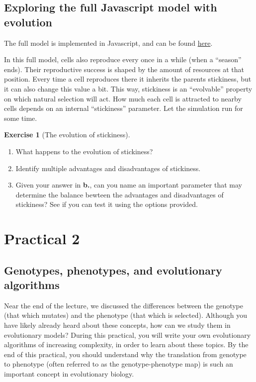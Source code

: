 \documentclass[
  letterpaper,
  DIV=11,
  numbers=noendperiod]{scrreprt}
\providecommand{\tightlist}{%
  \setlength{\itemsep}{0pt}\setlength{\parskip}{0pt}}\usepackage{longtable,booktabs,array}
\theoremstyle{definition}
\newtheorem{exercise}{Exercise}[chapter]
\theoremstyle{remark}
\begin{document}
\section{Exploring the full Javascript model with
evolution}\label{exploring-the-full-javascript-model-with-evolution}

The full model is implemented in Javascript, and can be found
\href{https://tbb.bio.uu.nl/bvd/simulations/collective_evolving_multi/}{here}.

In this full model, cells also reproduce every once in a while (when a
``season'' ends). Their reproductive success is shaped by the amount of
resources at that position. Every time a cell reproduces there it
inherits the parents stickiness, but it can also change this value a
bit. This way, stickiness is an ``evolvable'' property on which natural
selection will act. How much each cell is attracted to nearby cells
depends on an internal ``stickiness'' parameter. Let the simulation run
for some time.

\begin{exercise}[The evolution of
stickiness]\protect\hypertarget{exr-jsmodel}{}\label{exr-jsmodel}

\begin{enumerate}
\def\labelenumi{\alph{enumi}.}
\tightlist
\item
  What happens to the evolution of stickiness?
\item
  Identify multiple advantages and disadvantages of stickiness.
\item
  Given your answer in \textbf{b.}, can you name an important parameter
  that may determine the balance bewteen the advantages and
  disadvantages of stickiness? See if you can test it using the options
  provided.
\end{enumerate}

\end{exercise}

\chapter{Practical 2}\label{practical-2-3}

\section{Genotypes, phenotypes, and evolutionary
algorithms}\label{genotypes-phenotypes-and-evolutionary-algorithms}

Near the end of the lecture, we discussed the differences between the
genotype (that which mutates) and the phenotype (that which is
selected). Although you have likely already heard about these concepts,
how can we study them in evolutionary models? During this practical, you
will write your own evolutionary algorithms of increasing complexity, in
order to learn about these topics. By the end of this practical, you
should understand why the translation from genotype to phenotype (often
referred to as the genotype-phenotype map) is such an important concept
in evolutionary biology.
\end{document}
